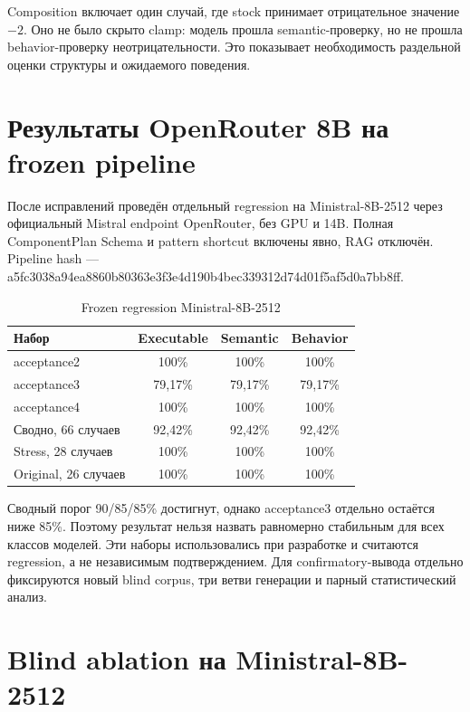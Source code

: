Composition включает один случай, где stock принимает отрицательное значение $-2$. Оно не было скрыто clamp: модель прошла semantic-проверку, но не прошла behavior-проверку неотрицательности. Это показывает необходимость раздельной оценки структуры и ожидаемого поведения.

\section{Результаты OpenRouter 8B на frozen pipeline}

После исправлений проведён отдельный regression на Ministral-8B-2512 через официальный Mistral endpoint OpenRouter, без GPU и 14B. Полная ComponentPlan Schema и pattern shortcut включены явно, RAG отключён. Pipeline hash --- {\scriptsize\ttfamily a5fc3038a94ea886\allowbreak 0b80363e3f3e4d19\allowbreak 0b4bec339312d74d01\allowbreak f5af5d0a7bb8ff}.

\begin{table}[H]
    \centering
    \caption{Frozen regression Ministral-8B-2512}
    \label{tab:ministral-regression}
    \small
    \begin{tabular}{lccc}
        \toprule
        Набор & Executable & Semantic & Behavior \\
        \midrule
        acceptance2 & 100\% & 100\% & 100\% \\
        acceptance3 & 79,17\% & 79,17\% & 79,17\% \\
        acceptance4 & 100\% & 100\% & 100\% \\
        \midrule
        Сводно, 66 случаев & 92,42\% & 92,42\% & 92,42\% \\
        Stress, 28 случаев & 100\% & 100\% & 100\% \\
        Original, 26 случаев & 100\% & 100\% & 100\% \\
        \bottomrule
    \end{tabular}
\end{table}

Сводный порог 90/85/85\% достигнут, однако acceptance3 отдельно остаётся ниже 85\%. Поэтому результат нельзя назвать равномерно стабильным для всех классов моделей. Эти наборы использовались при разработке и считаются regression, а не независимым подтверждением. Для confirmatory-вывода отдельно фиксируются новый blind corpus, три ветви генерации и парный статистический анализ.

\section{Blind ablation на Ministral-8B-2512}

